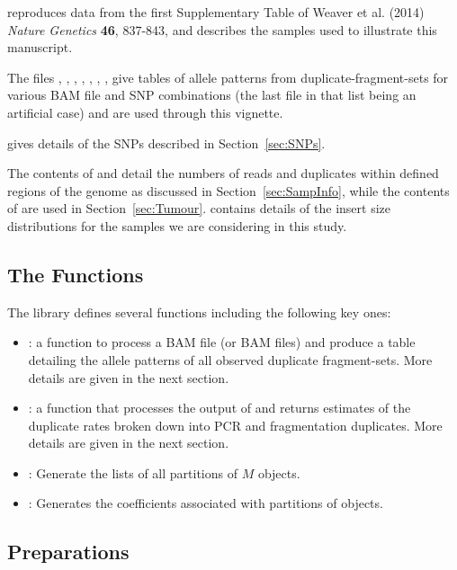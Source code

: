 \documentclass{article}
\begin{document}
 reproduces data from the first Supplementary Table of Weaver et al. (2014) \emph{Nature Genetics} \textbf{46}, 837-843, and describes the samples used to illustrate this manuscript.

The files , , , , , , ,  give tables of allele patterns from duplicate-fragment-sets for various BAM file and SNP combinations (the last file in that list being an artificial case) and are used through this vignette.

 gives details of the SNPs described in Section~\ref{sec:SNPs}.

The contents of  and  detail the numbers of reads and duplicates within defined regions of the genome as discussed in Section~\ref{sec:SampInfo}, while the contents of  are used in Section~\ref{sec:Tumour}.  contains details of the insert size distributions for the samples we are considering in this study.


\subsection{The Functions}

The library defines several functions including the following key ones:

\begin{itemize}
  \item {}: a function to process a BAM file (or BAM files) and produce a table detailing the allele patterns of all observed duplicate fragment-sets. More details are given in the next section.
  \item {}: a function that processes the output of  and returns estimates of the duplicate rates broken down into PCR and fragmentation duplicates. More details are given in the next section.
    \item {}: Generate the lists of all partitions of $M$ objects.
    \item {}: Generates the coefficients associated with partitions of objects.
\end{itemize}


\subsection{Preparations}
\end{document}
